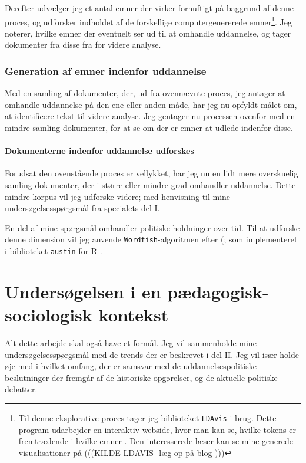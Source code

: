 Derefter udvælger jeg et antal emner der virker fornuftigt på baggrund af denne proces, og udforsker indholdet af de forskellige computergenererede emner\footnote{Til denne eksplorative proces tager jeg biblioteket \texttt{LDAvis} i brug. Dette program udarbejder en interaktiv webside, hvor man kan se, hvilke tokens er fremtrædende i hvilke emner \autocite{sievertCpsievertLDAvis2020}. Den interesserede læser kan se mine generede visualisationer på (((KILDE LDAVIS- læg op på blog )))}.
Jeg noterer, hvilke emner der eventuelt ser ud til at omhandle uddannelse, og tager dokumenter fra disse fra for videre analyse.

\subsection{Generation af emner indenfor uddannelse}
Med en samling af dokumenter, der, ud fra ovennævnte proces, jeg antager at omhandle uddannelse på den ene eller anden måde, har jeg nu opfyldt målet om, at identificere tekst til videre analyse.
Jeg gentager nu processen ovenfor med en mindre samling dokumenter, for at se om der er emner at udlede indenfor disse.

\subsubsection{Dokumenterne indenfor uddannelse udforskes}
Forudsat den ovenstående proces er vellykket, har jeg nu en lidt mere overskuelig samling dokumenter, der i større eller mindre grad omhandler uddannelse.
Dette mindre korpus vil jeg udforske videre; med henvisning til mine undersøgelsesspørgsmål fra specialets del I.

En del af mine spørgsmål omhandler politiske holdninger over tid. Til at udforske denne dimension vil jeg anvende \texttt{Wordfish}-algoritmen efter \citeauthor{slapinScalingModelEstimating2008} (\citeyear{slapinScalingModelEstimating2008}; som implementeret i biblioteket \texttt{austin} for R \autocite{loweAustinPackageDoing2019}.

\chapter{Undersøgelsen i en pædagogisk-sociologisk kontekst}\label{chap:edusoc}

Alt dette arbejde skal også have et formål.
Jeg vil sammenholde mine undersøgelsesspørgsmål med de trends der er beskrevet i del II.
Jeg vil især holde øje med i hvilket omfang, der er samsvar med de uddannelsespolitiske beslutninger der fremgår af de historiske opgørelser, og de aktuelle politiske debatter.
